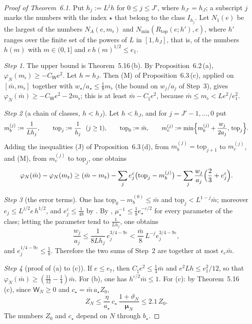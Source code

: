 \documentclass[11pt]{amsart}
\theoremstyle{definition}
\begin{document}
\begin{proof}[Proof of Theorem~6.1]
Put $h_j:=L^jh$ for $0\le j\le J'$, where $h_{J'}=h_J$;
a subscript $j$ marks the numbers with the index $\star$ that belong to the class $I_{h_j}$.
Let $N_1(e)$ be the largest of the numbers $N_A(e,m_\flat)$ and $N_{\min}(R_{\mathrm{top}}(e;h'),e)$, where $h'$ ranges over the finite set of the powers of $L$ in $[1,h_J]$, that is, of the numbers $h(m)$ with $m\in(0,1]$ and $e\,h(m)^{1/2}\le e_1$.

\emph{Step 1}.
The upper bound is Theorem~5.16\,(b).
By Proposition~6.2\,(a), $\varphi_N(m_\flat)\ge-C_{\mathsf W}e^2$.
Let $h=h_J$.
Then (M) of Proposition~6.3\,(c), applied on $[\bar m,m_\flat]$ together with $w_\star/a_\star\le\frac18m_\flat$ (the bound on $w_j/a_j$ of Step~3), gives $\varphi_N(\bar m)\ge-C_{\mathsf W}e^2-2m_\flat$;
this is at least $\bar m-C_\natural e^2$, because $\bar m\le m_\flat<Le^2/e_1^2$.

\emph{Step 2} (a chain of classes, $h<h_J$).
Let $h<h_J$, and for $j=J'-1,\dots,0$ put
\begin{equation*}
m_b^{(j)}:=\frac1{Lh_j},\qquad\mathrm{top}_j:=\frac1{h_j}\ \ (j\ge1),\qquad\mathrm{top}_0:=\bar m,\qquad m_c^{(j)}:=\min\Bigl\{m_b^{(j)}+\frac{w_j}{2a_j},\,\mathrm{top}_j\Bigr\}.
\end{equation*}
Adding the inequalities (J) of Proposition~6.3\,(d), from $m_b^{(j)}=\mathrm{top}_{j+1}$ to $m_c^{(j)}$, and (M), from $m_c^{(j)}$ to $\mathrm{top}_j$, one obtains
\begin{equation*}
\varphi_N(\bar m)-\varphi_N(m_\flat)\ge(\bar m-m_\flat)-\sum_je_j^\varepsilon\bigl(\mathrm{top}_j-m_b^{(j)}\bigr)-\sum_j\frac{w_j}{a_j}\Bigl(\frac23+e_j^\varepsilon\Bigr).
\end{equation*}

\emph{Step 3} (the error terms).
One has $\mathrm{top}_0-m_b^{(0)}\le\bar m$ and $\mathrm{top}_j<L^{1-j}\bar m$;
moreover $e_j\le L^{j/2}e\,h^{1/2}$, and $e_j^\varepsilon\le\frac1{48}$ by \cite[(fl)]{QEDIII}.
By \cite[(T2)]{QEDIII}, $\mu_\star^{-1}\le\frac18e_\star^{-\varepsilon/2}$ for every parameter of the class;
letting the parameter tend to $\frac1{Lh_j}$, one obtains
\begin{equation*}
\frac{w_j}{a_j}\le\frac1{8Lh_j}\,e_j^{3/4-9\varepsilon}<\frac{\bar m}8\,L^{-j}e_j^{3/4-9\varepsilon},
\end{equation*}
and $e_j^{1/4-9\varepsilon}\le\frac18$.
Therefore the two sums of Step~2 are together at most $\epsilon_e\bar m$.

\emph{Step 4} (proof of (a) to (c)).
If $e\le e_7$, then $C_\natural e^2\le\frac14\bar m$ and $e^2Lh\le e_1^2/12$, so that $\varphi_N(\bar m)\ge(\frac{11}{12}-\frac14)\bar m$.
For (b), one has $h^{\varepsilon/2}\bar m\le1$.
For (c): by Theorem~5.16\,(c), since $\mathsf W_N\ge0$ and $c_\star=\bar m\,a_\star Z_0$,
\begin{equation*}
Z_N\le\frac\eta{a_\star}\,c_\star\,\frac{1+\vartheta_N}{\boldsymbol\mu_N}\le2.1\,Z_0 .
\end{equation*}
The numbers $Z_0$ and $c_\star$ depend on $N$ through $b_\star$.
\end{proof}
\end{document}
